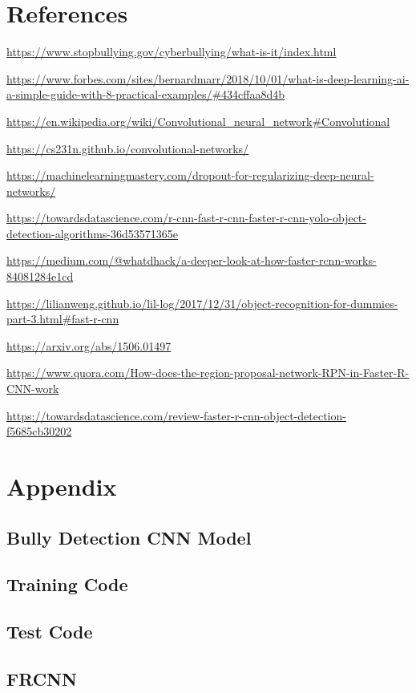 \documentclass[12pt]{article}
\begin{document}
\section{References}
\begin{enumerate}[label={[\arabic*]}]
\item \url{https://www.stopbullying.gov/cyberbullying/what-is-it/index.html}
\item \url{https://www.forbes.com/sites/bernardmarr/2018/10/01/what-is-deep-learning-ai-a-simple-guide-with-8-practical-examples/#434cffaa8d4b}
\item \url{https://en.wikipedia.org/wiki/Convolutional_neural_network#Convolutional}
\item \url{https://cs231n.github.io/convolutional-networks/}
\item \url{https://machinelearningmastery.com/dropout-for-regularizing-deep-neural-networks/}
\item \url{https://towardsdatascience.com/r-cnn-fast-r-cnn-faster-r-cnn-yolo-object-detection-algorithms-36d53571365e}
\item \url{https://medium.com/@whatdhack/a-deeper-look-at-how-faster-rcnn-works-84081284e1cd}
\item \url{https://lilianweng.github.io/lil-log/2017/12/31/object-recognition-for-dummies-part-3.html#fast-r-cnn}
\item \url{https://arxiv.org/abs/1506.01497}
\item \url{https://www.quora.com/How-does-the-region-proposal-network-RPN-in-Faster-R-CNN-work}
\item \url{https://towardsdatascience.com/review-faster-r-cnn-object-detection-f5685cb30202}
\end{enumerate}
\newpage

\section{Appendix}
\subsection{Bully Detection CNN Model}

\subsection{Training Code}

\subsection{Test Code}

\subsection{FRCNN}

\end{document}
